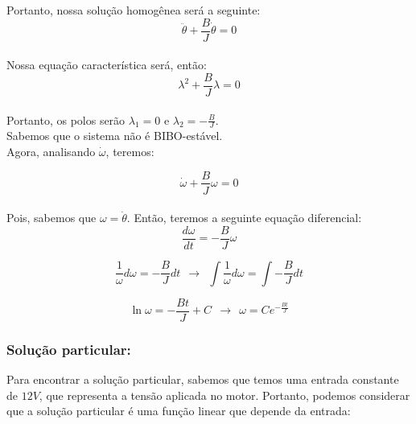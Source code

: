 \documentclass[a4paper, 12pt]{article}
\begin{document}
Portanto, nossa solução homogênea será a seguinte:\\

\begin{equation}
    \ddot \theta + \frac{B}{J} \dot \theta = 0
\end{equation} \\

Nossa equação característica será, então: \\

\begin{equation}
    \lambda ^ 2 + \frac{B}{J} \lambda  = 0
\end{equation} \\

Portanto, os polos serão $\lambda_1 = 0 $ e $\lambda_2 = - \frac{B}{J}$. \\

Sabemos que o sistema não é BIBO-estável.  \\

Agora, analisando $\dot \omega$, teremos:

\begin{equation}
    \dot \omega + \frac{B}{J} \omega = 0
\end{equation} \\

Pois, sabemos que $\omega = \dot \theta$. Então, teremos a seguinte equação diferencial:\\ 

\begin{equation*}
    \frac{d \omega}{dt}  = - \frac{B}{J} \omega
\end{equation*}

\begin{equation*}
    \frac{1}{\omega}d\omega  = - \frac{B}{J} dt \>\ \longrightarrow \>\ \int \frac{1}{\omega}d\omega = \int -\frac{B}{J}dt
\end{equation*}

\begin{equation*}
    \ln{\omega} = - \frac{Bt}{J} + C \>\ \longrightarrow \>\ \omega = C e^{-\frac{Bt}{J}}
\end{equation*}

\subsubsection{Solução particular:}

Para encontrar a solução particular, sabemos que temos uma entrada constante de $12V$, que representa a tensão aplicada no motor. Portanto, podemos considerar que a solução particular é uma função linear que depende da entrada: 
\end{document}
